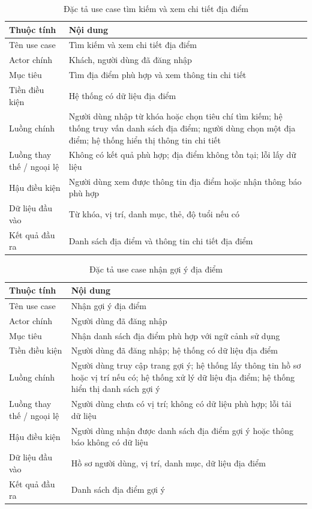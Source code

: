 ﻿\documentclass[../DoAn.tex]{subfiles}
\begin{document}
\begin{table}[H]
\centering
\caption{Đặc tả use case tìm kiếm và xem chi tiết địa điểm}
\label{tab:uc-search-detail}
\small
\renewcommand{\arraystretch}{1.15}
\setlength{\tabcolsep}{4pt}
\begin{tabularx}{\textwidth}{|L{3.4cm}|Y|}
\hline
\textbf{Thuộc tính} & \textbf{Nội dung} \\
\hline
Tên use case & Tìm kiếm và xem chi tiết địa điểm \\
\hline
Actor chính & Khách, người dùng đã đăng nhập \\
\hline
Mục tiêu & Tìm địa điểm phù hợp và xem thông tin chi tiết \\
\hline
Tiền điều kiện & Hệ thống có dữ liệu địa điểm \\
\hline
Luồng chính & Người dùng nhập từ khóa hoặc chọn tiêu chí tìm kiếm; hệ thống truy vấn danh sách địa điểm; người dùng chọn một địa điểm; hệ thống hiển thị thông tin chi tiết \\
\hline
Luồng thay thế / ngoại lệ & Không có kết quả phù hợp; địa điểm không tồn tại; lỗi lấy dữ liệu \\
\hline
Hậu điều kiện & Người dùng xem được thông tin địa điểm hoặc nhận thông báo phù hợp \\
\hline
Dữ liệu đầu vào & Từ khóa, vị trí, danh mục, thẻ, độ tuổi nếu có \\
\hline
Kết quả đầu ra & Danh sách địa điểm và thông tin chi tiết địa điểm \\
\hline
\end{tabularx}
\end{table}

\begin{table}[H]
\centering
\caption{Đặc tả use case nhận gợi ý địa điểm}
\label{tab:uc-suggestion}
\small
\renewcommand{\arraystretch}{1.15}
\setlength{\tabcolsep}{4pt}
\begin{tabularx}{\textwidth}{|L{3.4cm}|Y|}
\hline
\textbf{Thuộc tính} & \textbf{Nội dung} \\
\hline
Tên use case & Nhận gợi ý địa điểm \\
\hline
Actor chính & Người dùng đã đăng nhập \\
\hline
Mục tiêu & Nhận danh sách địa điểm phù hợp với ngữ cảnh sử dụng \\
\hline
Tiền điều kiện & Người dùng đã đăng nhập; hệ thống có dữ liệu địa điểm \\
\hline
Luồng chính & Người dùng truy cập trang gợi ý; hệ thống lấy thông tin hồ sơ hoặc vị trí nếu có; hệ thống xử lý dữ liệu địa điểm; hệ thống hiển thị danh sách gợi ý \\
\hline
Luồng thay thế / ngoại lệ & Người dùng chưa có vị trí; không có dữ liệu phù hợp; lỗi tải dữ liệu \\
\hline
Hậu điều kiện & Người dùng nhận được danh sách địa điểm gợi ý hoặc thông báo không có dữ liệu \\
\hline
Dữ liệu đầu vào & Hồ sơ người dùng, vị trí, danh mục, dữ liệu địa điểm \\
\hline
Kết quả đầu ra & Danh sách địa điểm gợi ý \\
\hline
\end{tabularx}
\end{table}
\end{document}
